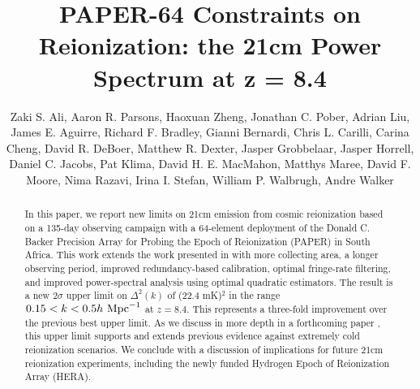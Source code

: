 \documentclass[twocolumn,numberedappendix]{emulateapj} \shorttitle{New Limits on the 21 cm Power Spectrum at $z=8.4$}
\newcommand{\hMpci}{h\ {\rm Mpc}^{-1}}
\newcommand{\mKlimit}{(22.4 mK)$^2$ }
\begin{document}
\title{PAPER-64 Constraints on Reionization: the 21cm Power Spectrum at z = 8.4}

\author{
Zaki S. Ali, 
Aaron R. Parsons, 
Haoxuan Zheng,
Jonathan C. Pober, 
Adrian Liu, 
James E. Aguirre,
Richard F. Bradley,
Gianni Bernardi, 
Chris L. Carilli,
Carina Cheng,
David R. DeBoer, 
Matthew R. Dexter,
Jasper Grobbelaar,
Jasper Horrell,
Daniel C. Jacobs, 
Pat Klima,
David H. E. MacMahon,
Matthys Maree,
David F. Moore,
Nima Razavi,
Irina I. Stefan,
William P. Walbrugh,
Andre Walker
}


\begin{abstract}
In this paper, we report new limits on 21cm emission from cosmic reionization
based on a 135-day observing campaign with a 64-element deployment of the
Donald C. Backer Precision Array for Probing the Epoch of Reionization (PAPER)
in South Africa.  This work extends the work presented in
\citet{parsons_et_al2014} with more collecting area, a longer observing period, improved redundancy-based
calibration, optimal fringe-rate filtering, and improved power-spectral
analysis using optimal quadratic estimators. The result is a new $2\sigma$
upper limit on $\Delta^2(k)$ of \mKlimit in the range
$0.15<k<0.5\hMpci$ at $z=8.4$.  This represents a three-fold improvement over the
previous best upper limit.  As we discuss in more depth in a forthcoming paper
\citep{pober_et_al2015}, this upper limit supports and extends previous
evidence against extremely cold reionization scenarios.  We conclude with a
discussion of implications for future 21cm reionization experiments, including
the newly funded Hydrogen Epoch of Reionization Array (HERA).  
\end{abstract}
\end{document}
